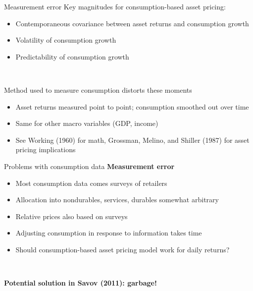 \documentclass[xcolor=table, aspectratio=169]{beamer}
\newcommand{\alertbf}[1]{\alert{\textbf{#1}}}
\begin{document}
\begin{frame}{Measurement error}
Key magnitudes for consumption-based asset pricing:
\begin{itemize}
\item Contemporaneous covariance between asset returns and consumption growth
\item Volatility of consumption growth
\item Predictability of consumption growth
\end{itemize}

~

Method used to measure consumption distorts these moments
\begin{itemize}
\item Asset returns measured point to point; consumption smoothed out over time
\item Same for other macro variables (GDP, income)
\item See Working (1960) for math, Grossman, Melino, and Shiller (1987) for asset pricing implications
\end{itemize}

\end{frame}

\begin{frame}{Problems with consumption data}
\alertbf{Measurement error}
\begin{itemize}
\item Most consumption data comes surveys of retailers
\item Allocation into nondurables, services, durables somewhat arbitrary
\item Relative prices also based on surveys
\item Adjusting consumption in response to information takes time
\item Should consumption-based asset pricing model work for daily returns?
\end{itemize}

~

\alertbf{Potential solution in Savov (2011): garbage!}
\end{frame}

\end{document}
